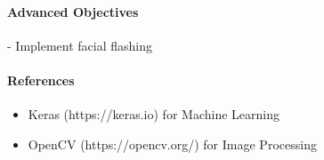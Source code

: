 \documentclass{article}
\begin{document}
    \paragraph{Advanced Objectives}
        \begin{itemize}
         - Implement facial flashing
        \end{itemize}
    \paragraph{References}
        \begin{itemize}
            \item Keras (https://keras.io) for Machine Learning
            \item OpenCV (https://opencv.org/) for Image Processing
        \end{itemize}

   
\end{document}
